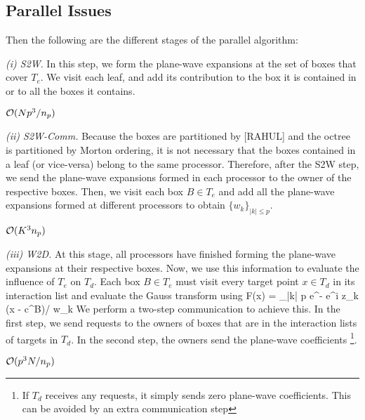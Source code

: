 
\subsection{Parallel Issues}

Then the following are the different stages of the parallel algorithm:

{\em (i) S2W}. In this step, we form the plane-wave expansions at the set of boxes that cover $T_e$. 
We visit each leaf, and add its contribution to the box it is contained in or to all the boxes it contains. 

\hfill $\mathcal{O}(N p^3/n_p)$

{\em (ii) S2W-Comm.} Because the boxes are partitioned by [RAHUL] and the octree is partitioned by Morton ordering, it is not necessary that the boxes contained in a leaf (or vice-versa) belong to the same processor. Therefore, after the S2W step, we send the plane-wave expansions formed in each processor to the owner of the respective boxes. Then, we visit each box $B \in T_e$ and add all the plane-wave expansions formed at different processors to obtain $\{w_k \}_{|k| \leq p}$.  

\hfill $\mathcal{O}(K^3 n_p)$

{\em (iii) W2D.} At this stage, all processors have finished forming the plane-wave expansions at their respective boxes. 
Now, we use this information to evaluate the influence of $T_e$ on $T_d$. Each box $B \in T_e$ must visit every target point $x \in T_d$ in its interaction list and evaluate the Gauss transform using
%
\beq F(x) = \sum_{|k| \leq p} e^{-} e^{i z_k \cdot (x - c^B)/\sqrt{\delta}} w_k \eeq
%
We perform a two-step communication to achieve this. In the first step, we send requests to the owners of boxes that are in the interaction lists of targets in $T_d$. In the second step, the owners send the plane-wave coefficients \footnote{ If $T_d$ receives any requests, it simply sends zero plane-wave coefficients. This can be avoided by an extra communication step}. 

\hfill $\mathcal{O}(p^3 N / n_p)$

